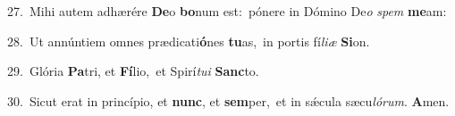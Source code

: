 {\numbfont\textcolor{\numbcolor}{27.}}~Mihi autem adhærére \textbf{De}\-o \textbf{bo}\-num est:~\star pónere in Dómino De\textit{o} \textit{spem} \textbf{me}\-am:\par
{\numbfont\textcolor{\numbcolor}{28.}}~Ut annúntiem omnes prædicati\-\textbf{ó}\-nes \textbf{tu}\-as,~\star in portis fí\-\textit{li}\-\textit{æ} \textbf{Si}\-on.\par
{\numbfont\textcolor{\numbcolor}{29.}}~Glória \textbf{Pa}\-tri, et \textbf{Fí}\-lio,~\star et Spirí\-\textit{tu}\-\textit{i} \textbf{Sanc}\-to.\par
{\numbfont\textcolor{\numbcolor}{30.}}~Sicut erat in princípio, et \textbf{nunc}\-, et \textbf{sem}\-per,~\star et in sǽcula sæcu\-\textit{ló}\-\textit{rum}. \textbf{A}\-men.\par
